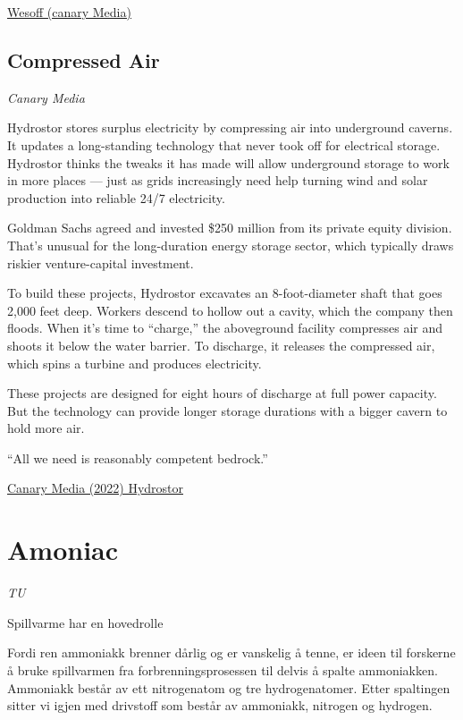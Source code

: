 \documentclass[
]{book}
\begin{document}
\href{https://www.canarymedia.com/articles/long-duration-storage-roundup-news-players-and-technology/}{Wesoff (canary Media)}

\hypertarget{compressed-air}{%
\section{Compressed Air}\label{compressed-air}}

\emph{Canary Media}

Hydrostor stores surplus electricity by compressing air into underground caverns. It updates a long-standing technology that never took off for electrical storage. Hydrostor thinks the tweaks it has made will allow underground storage to work in more places --- just as grids increasingly need help turning wind and solar production into reliable 24/7 electricity.

Goldman Sachs agreed and invested \$250 million from its private equity division. That's unusual for the long-duration energy storage sector, which typically draws riskier venture-capital investment.

To build these projects, Hydrostor excavates an 8-foot-diameter shaft that goes 2,000 feet deep. Workers descend to hollow out a cavity, which the company then floods. When it's time to \hspace{0pt}``charge,'' the aboveground facility compresses air and shoots it below the water barrier. To discharge, it releases the compressed air, which spins a turbine and produces electricity.

These projects are designed for eight hours of discharge at full power capacity. But the technology can provide longer storage durations with a bigger cavern to hold more air.

``All we need is reasonably competent bedrock.''

\href{https://www.canarymedia.com/articles/long-duration-energy-storage/goldman-sachs-just-made-a-record-setting-investment-in-long-duration-energy-storage}{Canary Media (2022) Hydrostor}

\hypertarget{amoniac}{%
\chapter{Amoniac}\label{amoniac}}

\emph{TU}

Spillvarme har en hovedrolle

Fordi ren ammoniakk brenner dårlig og er vanskelig å tenne, er ideen til forskerne å bruke spillvarmen fra forbrenningsprosessen til delvis å spalte ammoniakken. Ammoniakk består av ett nitrogenatom og tre hydrogenatomer. Etter spaltingen sitter vi igjen med drivstoff som består av ammoniakk, nitrogen og hydrogen.
\end{document}
